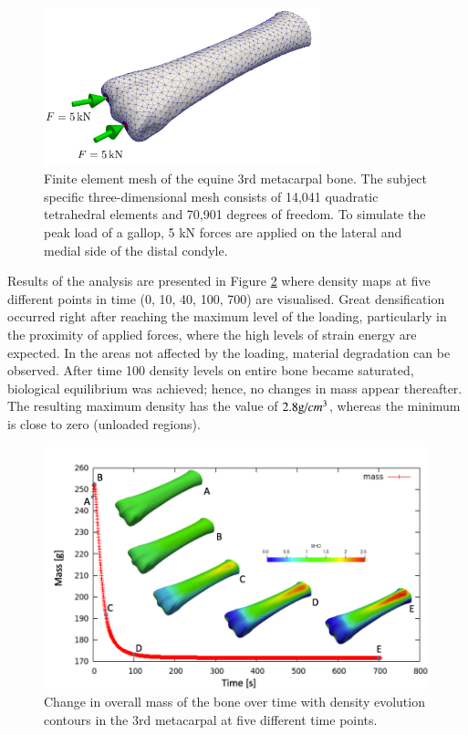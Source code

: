 \documentclass[11pt]{ACMEarticle}
\numberwithin{equation}{section}
\begin{document}
\begin{figure}[h!]
	\begin{centering}
		\includegraphics[width=8cm]{Figures/mc3_BC}
		\caption{Finite element mesh of the equine 3rd metacarpal bone. The subject specific three-dimensional mesh consists of 14,041 quadratic tetrahedral elements and 70,901 degrees of freedom. To simulate the peak load of a gallop, 5 kN forces are applied on the lateral and medial side of the distal condyle.}
		\label{fig:mc3_BC}
	\end{centering}
\end{figure}
Results of the analysis are presented in Figure \ref{fig:mc3_density} where density maps at five different points in time (0, 10, 40, 100, 700) are visualised. Great densification occurred right after reaching the maximum level of the loading, particularly in the proximity of applied forces, where the high levels of strain energy are expected. In the areas not affected by the loading, material degradation can be observed. After time 100 density levels on entire bone became saturated, biological equilibrium was achieved; hence, no changes in mass appear thereafter. The resulting maximum density has the value of $2.8 \text g \text / {cm}^3$, whereas the minimum is close to zero (unloaded regions).
\begin{figure}[h!]
	\begin{centering}
		\includegraphics[width=15cm]{Figures/graphs/mc3_density}
		\caption{Change in overall mass of the bone over time with density evolution contours in the 3rd metacarpal at five different time points.}
		\label{fig:mc3_density}
	\end{centering}
\end{figure}
\end{document}
